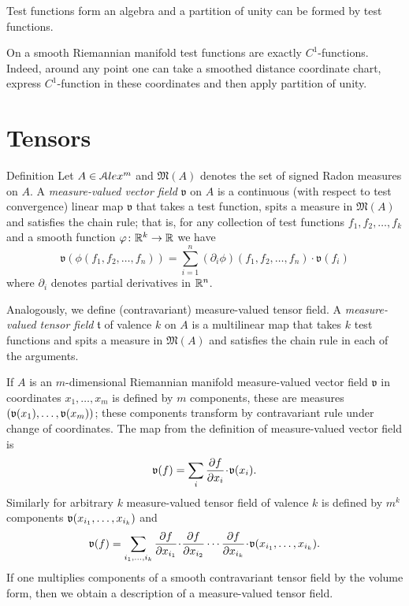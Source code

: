 Test functions form an algebra and a
partition of unity can be formed by test functions.

On a smooth Riemannian manifold test functions
are exactly $C^1$-functions.
Indeed, around any point one can take a
smoothed distance 
coordinate chart, express $C^1$-function in these 
coordinates and then apply partition of unity. 
 
 
\section{Tensors}


\begin{rdef} {Definition}\label{def:mestens}
Let $A\in \mathcal{A}lex^m$ and $\mathfrak M(A)$
denotes the set of signed Radon measures on $A$.
A \emph{measure-valued vector field} $\mathfrak{v}$  on $A$
is a  continuous (with respect to test convergence) linear map
$\mathfrak{v}$ that takes a test function, spits a measure in $\mathfrak M(A)$ and satisfies the
chain rule;
that is, for any collection of test functions $f_1,f_2,\dots,f_k$
and a smooth function $\varphi\colon\mathbb{R}^k\to\mathbb{R}$ we have
$$\mathfrak{v}(\phi(f_1,f_2,\dots,f_n))
=
\sum_{i=1}^n (\partial_i\phi)(f_1,f_2,\dots,f_n)\cdot\mathfrak{v}(f_i)$$
where $\partial_i$ denotes partial derivatives in $\mathbb{R}^n$.

Analogously, we define (contravariant) measure-valued tensor field.
A \emph{measure-valued tensor field} $\mathfrak{t}$ of valence $k$ on $A$ is a multilinear map that takes $k$ test functions and spits a measure in $\mathfrak M(A)$ and satisfies the chain rule in each of the arguments.
\end{rdef}

If $A$ is an $m$-dimensional Riemannian manifold measure-valued vector field $\mathfrak{v}$  in coordinates $x_1,\dots,x_m$
is defined by $m$ components, these are measures $(\mathfrak{v}(x_1),\dots,\mathfrak{v}(x_m))$;
these components transform by contravariant rule under change of coordinates.
 The map from the definition of measure-valued vector field is
 \[\mathfrak{v}(f)=\sum_{i}\frac{\partial f}{\partial x_i}\cdot \vv(x_i).\]
 Similarly for arbitrary $k$ measure-valued tensor field of valence $k$ 
 is defined by $m^k$ components 
 $\mathfrak{v}(x_{i_1},\dots,x_{i_k})$
 and
 \[\mathfrak{v}(f)=\sum_{i_1,\dots,i_k}
 \frac{\partial f}{\partial x_{i_1}}\cdot 
 \frac{\partial f}{\partial x_{i_2}} \cdots \frac{\partial f}{\partial x_{i_k}}
 \cdot \vv(x_{i_1},\dots,x_{i_k}).\]
If one multiplies components of a smooth contravariant tensor field by the volume form,
then we obtain a description of a measure-valued tensor field.

